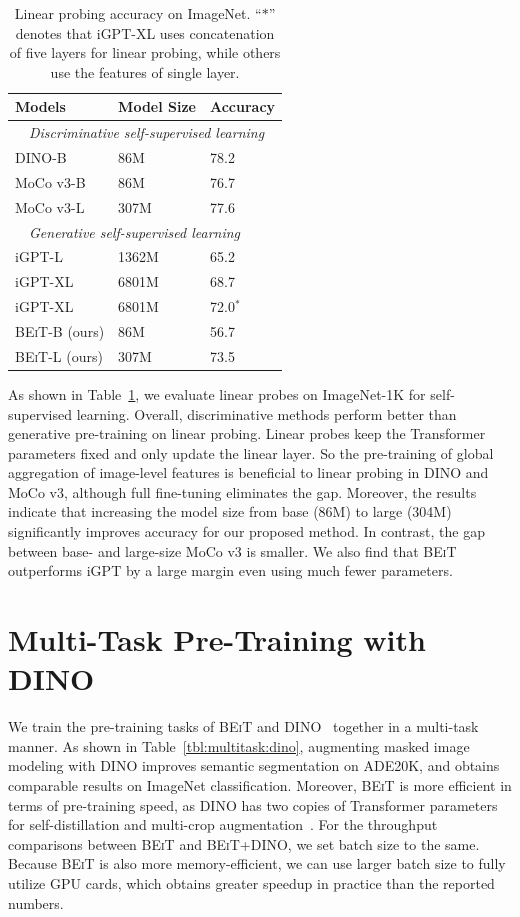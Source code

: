 \documentclass{article}
\newcommand\our{\textsc{BEiT}}
\begin{document}
\begin{table}[H]
\centering
\begin{tabular}{lll}
\toprule
\bf Models & \bf Model Size & \bf Accuracy \\ \midrule
\multicolumn{3}{l}{~~\textit{Discriminative self-supervised learning}} \\
DINO-B~\citep{dino} & 86M & 78.2 \\
MoCo v3-B~\citep{mocov3} & 86M & 76.7 \\
MoCo v3-L~\citep{mocov3} & 307M & 77.6 \\
\midrule
\multicolumn{3}{l}{~~\textit{Generative self-supervised learning}} \\
iGPT-L~\citep{igpt} & 1362M & 65.2 \\
iGPT-XL~\citep{igpt} & 6801M & 68.7 \\
iGPT-XL~\citep{igpt} & 6801M & 72.0$^*$ \\
\our{}-B (ours) & 86M & 56.7 \\
\our{}-L (ours) & 307M & 73.5 \\
\bottomrule
\end{tabular}
\caption{
Linear probing accuracy on ImageNet. ``$*$'' denotes that iGPT-XL uses concatenation of five layers for linear probing, while others use the features of single layer.
}
\label{tbl:linear_probe}
\end{table}


As shown in Table~\ref{tbl:linear_probe}, we evaluate linear probes on ImageNet-1K for self-supervised learning.
Overall, discriminative methods perform better than generative pre-training on linear probing.
Linear probes keep the Transformer parameters fixed and only update the linear layer. So the pre-training of global aggregation of image-level features is beneficial to linear probing in DINO and MoCo v3, although full fine-tuning eliminates the gap.
Moreover, the results indicate that increasing the model size from base (86M) to large (304M) significantly improves accuracy for our proposed method.
In contrast, the gap between base- and large-size MoCo v3 is smaller.
We also find that \our{} outperforms iGPT by a large margin even using much fewer parameters.


\section{Multi-Task Pre-Training with DINO}
\label{app:multitask:dino}

We train the pre-training tasks of \our{} and DINO~\citep{dino} together in a multi-task manner.
As shown in Table~\ref{tbl:multitask:dino}, augmenting masked image modeling with DINO improves semantic segmentation on ADE20K, and obtains comparable results on ImageNet classification.
Moreover, \our{} is more efficient in terms of pre-training speed, as DINO has two copies of Transformer parameters for self-distillation and multi-crop augmentation~\citep{swav}.
For the throughput comparisons between \our{} and \our{}+DINO, we set batch size to the same.
Because \our{} is also more memory-efficient, we can use larger batch size to fully utilize GPU cards, which obtains greater speedup in practice than the reported numbers.
\end{document}
